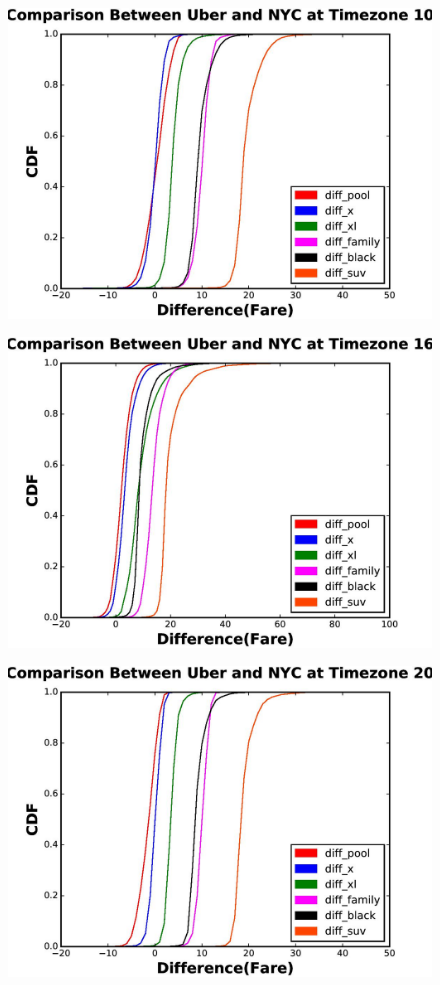 \documentclass{article}
\begin{document}
\begin{figure}
\begin{center}
\includegraphics[width=0.7\columnwidth]{figures/five}

\end{center}
\end{figure}

\begin{figure}
\begin{center}
\includegraphics[width=0.7\columnwidth]{figures/six}

\end{center}
\end{figure}

\begin{figure}
\begin{center}
\includegraphics[width=0.7\columnwidth]{figures/seven}

\end{center}
\end{figure}
\end{document}
